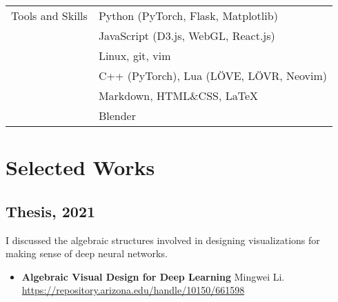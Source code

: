 \documentclass[letterpaper,11pt,oneside]{article}
\begin{document}
\begin{tabular}{@{} r l}
\Large{Tools and Skills}
    & Python (PyTorch, Flask, Matplotlib) \\
    & JavaScript (D3.js, WebGL, React.js) \\
    & Linux, git, vim \\
    & C++ (PyTorch), Lua (LÖVE, LÖVR, Neovim) \\ 
    & Markdown, HTML\&CSS, \LaTeX \\
    & Blender

\end{tabular}

\pagebreak

\section*{Selected Works}

\subsection*{Thesis, 2021}
I discussed the algebraic structures involved in designing visualizations for making sense of deep neural networks.
    \begin{itemize}
        \item \textbf{Algebraic Visual Design for Deep Learning} Mingwei Li. \url{https://repository.arizona.edu/handle/10150/661598}
    \end{itemize}
\end{document}
